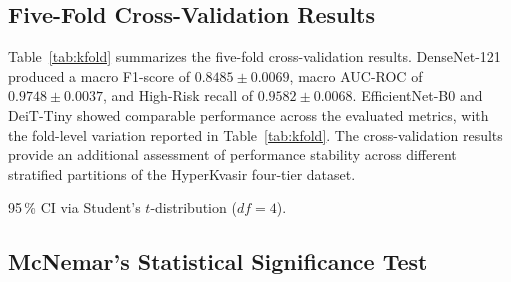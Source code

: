 \documentclass[11pt,a4paper]{article}
\begin{document}
\subsection{Five-Fold Cross-Validation Results}
\label{sec:kfold_results}

Table~\ref{tab:kfold} summarizes the five-fold cross-validation results.
DenseNet-121 produced a macro F1-score of $0.8485\pm0.0069$, macro AUC-ROC
of $0.9748\pm0.0037$, and High-Risk recall of $0.9582\pm0.0068$.
EfficientNet-B0 and DeiT-Tiny showed comparable performance across the
evaluated metrics, with the fold-level variation reported in
Table~\ref{tab:kfold}. The cross-validation results provide an additional
assessment of performance stability across different stratified partitions
of the HyperKvasir four-tier dataset.

\begin{table}[H]
\centering
\caption{5-fold cross-validation results on HyperKvasir (mean\,$\pm$\,std
  across 5 folds; 95\,\% CI in parentheses)}
\label{tab:kfold}
\par\smallskip
{\footnotesize 95\,\% CI via Student's $t$-distribution ($df=4$).}
\end{table}

\subsection{McNemar's Statistical Significance Test}
\label{sec:mcnemar_results}
\end{document}
